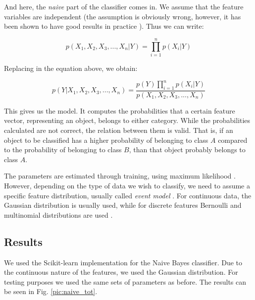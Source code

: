 And here, the \textit{naive} part of the classifier comes in. We assume that the feature variables are independent (the assumption is obviously wrong, however, it has been shown to have good results in practice \cite{rish2001empirical}). Thus we can write:

\begin{equation*}
p(X_1,X_2,X_3,..., X_n\vert Y) = \prod_{i=1}^np(X_i \vert Y)
\end{equation*}

Replacing in the equation above, we obtain:

\begin{equation*}
p(Y\vert X_1,X_2,X_3,..., X_n) = \frac{p(Y)\prod \limits_{i=1}^np(X_i \vert Y)}{p(X_1,X_2,X_3,..., X_n)}
\end{equation*}

This gives us the model. It computes the probabilities that a certain feature vector, representing an object, belongs to either category. While the probabilities calculated are not correct, the relation between them is valid. That is, if an object to be classified has a higher probability of belonging to class $A$ compared to the probability of belonging to class $B$, than that object probably belongs to class $A$. 

The parameters are estimated through training, using maximum likelihood \cite{zhang2004optimality}. However, depending on the type of data we wish to classify, we need to assume a specific feature distribution, usually called \textit{event model} \cite{mccallum1998comparison}. For continuous data, the Gaussian distribution is usually used, while for discrete features Bernoulli and multinomial distributions are used \cite{mccallum1998comparison}.

\subsection{Results}

We used the Scikit-learn \cite{scikit-learn} implementation for the Naive Bayes classifier. Due to the continuous nature of the features, we used the Gaussian distribution. For testing purposes we used the same sets of parameters as before. The results can be seen in Fig. \ref{pic:naive_tot}.

